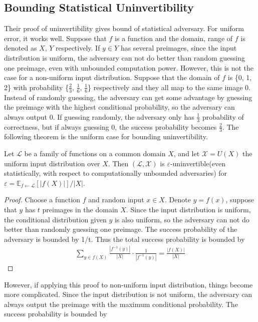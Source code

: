 \documentclass[a4paper]{article}
\theoremstyle{definition}
\theoremstyle{remark}
\renewcommand{\epsilon}{\varepsilon}
\begin{document}
\subsection{Bounding Statistical Uninvertibility}
Their proof of uninvertibility gives bound of statistical adversary. For uniform error, it works well. Suppose that $f$ is a function 
and the domain, range of $f$ is denoted as $X$, $Y$ respectively. If $y \in Y$ has several preimages, since 
the input distribution is uniform, the adversary can not do better than random guessing one preimage, even with unbounded computation
power. However, this is not the case for a non-uniform input distribution. Suppose that the domain of $f$ is \{0, 1, 2\} with 
probability \{$\frac{2}{3}$, $\frac{1}{6}$, $\frac{1}{6}$\} respectively and they all map to the same image 0. Instead of 
randomly guessing, the adversary can get some advantage by guessing the preimage with the highest conditional probability, 
so the adversary can always output 0. If guessing randomly, the adversary only has $\frac{1}{3}$ probability of correctness,
but if always guessing 0, the success probability becomes $\frac{2}{3}$.
The following theorem is the uniform case for bounding uninvertibility.
\begin{theorem}
  \label{uniformbound}
  Let $\mathcal{L}$ be a family of functions on a common domain $X$, and let $\mathcal{X} = U(X)$ the uniform input 
  distribution over $X$. Then $(\mathcal{L}, \mathcal{X})$ is $\epsilon$-uninvertible(even statistically, with respect to 
  computationally unbounded adversaries) for $\epsilon=\mathbb{E}_{f \leftarrow \mathcal{L}}[|f(X)| ] /| X |$.
    \end{theorem}
    \begin{proof}
        Choose a function $f$ and random input $x \in X$. Denote $ y = f(x)$, suppose that 
        $y$ has $t$ preimages in the domain $X$. Since the input distribution is uniform,
        the conditional distribution given $y$ is also uniform, so the adversary can not 
        do better than randomly guessing one preimage. The success probability of the adversary is bounded by 1/t.
        Thus the total success probability is bounded by
        \begin{gather*}
          \sum_{y \in f(X)} \frac{\left|f^{-1}(y)\right|}{|X|} \cdot \frac{1}{\left|f^{-1}(y)\right|}=\frac{|f(X)|}{|X|}
        \end{gather*}
    \end{proof}
However, if applying this proof to non-uniform input distribution, things become more complicated. Since the input distribution is 
not uniform, the adversary can always output the preimage with the maximum conditional probability.
The success probability is bounded by 
\end{document}
